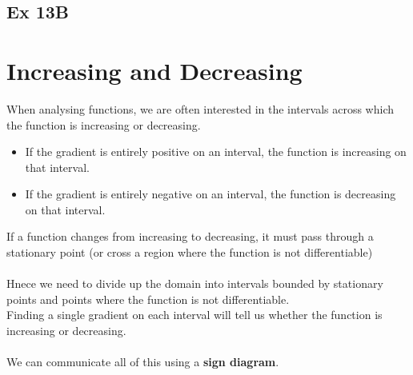 \documentclass[11pt]{report}
\newcommand{\x}{0}
\begin{document}
\begin{center}


\end{center}
\subsection{Ex 13B}
\newpage
 
\newpage
\section{Increasing and Decreasing}
When analysing functions, we are often interested in the intervals across which the function is  increasing or  decreasing.
\begin{itemize}
	\item If the gradient is entirely positive on an interval, the function is increasing on that interval.
	\item If the gradient is entirely negative on an interval, the function is decreasing on that interval.
\end{itemize}
If a function changes from increasing to decreasing, it must pass through a stationary point (or cross a region where the function is not differentiable)\\\\
Hnece we need to divide up the domain into intervals bounded by stationary points  and points where the function is not differentiable.\\
Finding a single gradient on each interval will tell us whether the function is increasing or decreasing.\\\\
We can communicate all of this using a \textbf{sign diagram}.
\end{document}
